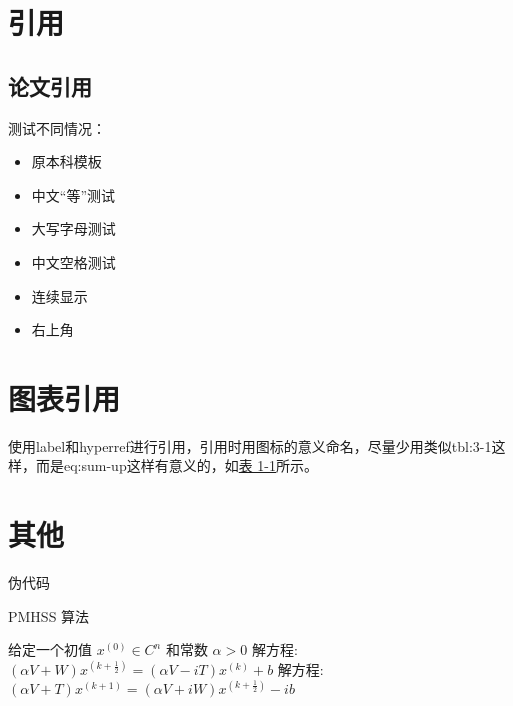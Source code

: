\documentclass[AutoFakeBold]{LZUThesis-PgD&PhD}
\begin{document}
\section{引用}

\subsection{论文引用}

测试不同情况：

\begin{itemize}
    \item 原本科模板\cite{partl2016}
    \item 中文“等”测试\cite{partl2021}
    \item 大写字母测试\cite{partl2022-2}
    \item 中文空格测试\cite{partl2022}
    \item 连续显示\cite{partl2016,partl2021,partl2022-2}
    \item 右上角
\end{itemize}

\section{图表引用}


使用label和hyperref进行引用，引用时用图标的意义命名，尽量少用类似tbl:3-1这样，而是eq:sum-up这样有意义的，如\hyperref[tbl:mole]{表 1-1}所示。

\section{其他}


伪代码

\begin{algorithm}[H]
    \caption{PMHSS 算法\label{Alg:PMHSS}}
    \begin{algorithmic}[1]
      \State 给定一个初值 $ x^{(0)} \in C^{n} $  和常数 $\alpha>0$
      \State 解方程: $(\alpha V+W)x^{(k+\frac{1}{2})}=(\alpha V-i T)x^{(k)}+b $
      \State 解方程: $(\alpha V+T)x^{(k+1)}=(\alpha V+i W)x^{(k+\frac{1}{2})}-i b$
      \EndFor
    \end{algorithmic}
\end{algorithm}
\end{document}
